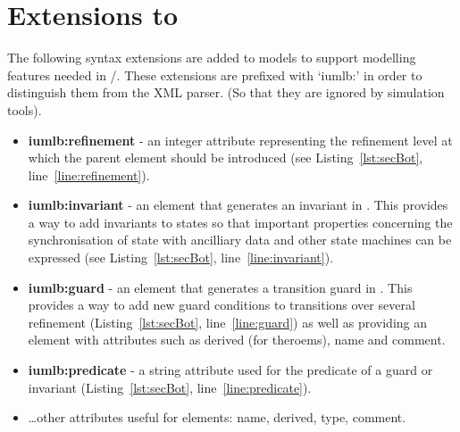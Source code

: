 
\section{Extensions to \SCXML}
\label{sec:extensions}
 
The following syntax extensions are added to \SCXML models to support modelling features needed in \iUMLB/\EventB. These extensions are prefixed with `iumlb:' in order to distinguish them from the \SCXML XML parser. (So that they are ignored by \SCXML simulation tools). 
\begin{itemize}
	\item \textbf{iumlb:refinement} - an integer attribute representing the refinement level at which the parent element should be introduced (see Listing~\ref{lst:secBot}, line~\ref{line:refinement}).
	\item \textbf{iumlb:invariant} - an element that generates an invariant in \iUMLB. This provides a way to add invariants to states so that important properties concerning the synchronisation of state with ancilliary data and other state machines can be expressed (see Listing~\ref{lst:secBot}, line~\ref{line:invariant}).
	\item \textbf{iumlb:guard} - an element that generates a transition guard in \iUMLB. 
	This provides a way to add new guard conditions to transitions over several refinement (Listing~\ref{lst:secBot}, line~\ref{line:guard}) as well as providing an element with attributes such as derived (for \EventB theroems), name and comment.
	\item \textbf{iumlb:predicate} - a string attribute used for the predicate of a guard or invariant (Listing~\ref{lst:secBot}, line~\ref{line:predicate}).
	\item \ldots other attributes useful for \iUMLB elements: name, derived, type, comment.
\end{itemize}

